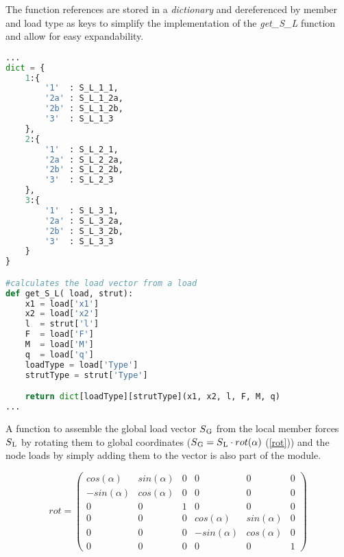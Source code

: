 The function references are stored in a \textit{dictionary} and dereferenced by member and load type as keys to simplify the implementation of the \textit{get\_S\_L} function and allow for easy expandability.

\begin{inconsolata}
\begin{minipage}{\linewidth}
\begin{lstlisting}[language=python]
...
dict = {
    1:{
        '1'  : S_L_1_1,
        '2a' : S_L_1_2a,
        '2b' : S_L_1_2b,
        '3'  : S_L_1_3
    },
    2:{
        '1'  : S_L_2_1,
        '2a' : S_L_2_2a,
        '2b' : S_L_2_2b,
        '3'  : S_L_2_3
    },
    3:{
        '1'  : S_L_3_1,
        '2a' : S_L_3_2a,
        '2b' : S_L_3_2b,
        '3'  : S_L_3_3
    }
}

#calculates the load vector from a load
def get_S_L( load, strut):
    x1 = load['x1']
    x2 = load['x2']
    l  = strut['l']
    F  = load['F']
    M  = load['M']
    q  = load['q']
    loadType = load['Type']
    strutType = strut['Type']

    return dict[loadType][strutType](x1, x2, l, F, M, q)
...
\end{lstlisting}
\end{minipage}
\end{inconsolata}

A function to assemble the global load vector $S\textsubscript{G}$ from the local member forces $S\textsubscript{L}$ by rotating them to global coordinates ($S\textsubscript{G} = S\textsubscript{L} \cdot rot(\alpha)$ (\cref{rot})) and the node loads by simply adding them to the vector is also part of the module.

\begin{equation} \label{rot}
rot = \begin{pmatrix}
cos(\alpha)  & sin(\alpha)  & 0   & 0             & 0             & 0   \\[0.2em]
-sin(\alpha) & cos(\alpha)  & 0   & 0             & 0             & 0   \\[0.2em]
0            & 0            & 1   & 0             & 0             & 0   \\[0.2em]
0            & 0            & 0   & cos(\alpha)   & sin(\alpha)   & 0   \\[0.2em]
0            & 0            & 0   & -sin(\alpha)  & cos(\alpha)   & 0   \\[0.2em]
0            & 0            & 0   & 0             & 0             & 1
     \end{pmatrix}
\end{equation}

